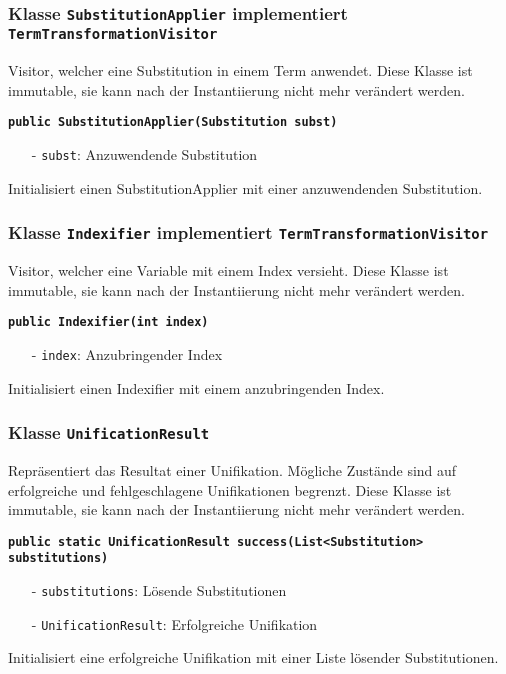 \documentclass[parskip=full,11pt,twoside]{scrartcl}
\begin{document}
\subsubsection{Klasse \texttt{SubstitutionApplier} implementiert \texttt{TermTransformationVisitor}}
Visitor, welcher eine Substitution in einem Term anwendet. Diese Klasse ist immutable, sie kann nach der Instantiierung nicht mehr verändert werden.

\textbf{\texttt{public SubstitutionApplier(Substitution subst)}}
\begin{itemize}[noitemsep]
	\item[-] \texttt{subst}: Anzuwendende Substitution
\end{itemize}
Initialisiert einen SubstitutionApplier mit einer anzuwendenden Substitution.

\subsubsection{Klasse \texttt{Indexifier} implementiert \texttt{TermTransformationVisitor}}
Visitor, welcher eine Variable mit einem Index versieht. Diese Klasse ist immutable, sie kann nach der Instantiierung nicht mehr verändert werden.

\textbf{\texttt{public Indexifier(int index)}}
\begin{itemize}[noitemsep]
	\item[-] \texttt{index}: Anzubringender Index
\end{itemize}
Initialisiert einen Indexifier mit einem anzubringenden Index.
\subsubsection{Klasse \texttt{UnificationResult}}
Repräsentiert das Resultat einer Unifikation. Mögliche Zustände sind auf erfolgreiche und fehlgeschlagene Unifikationen begrenzt. Diese Klasse ist immutable, sie kann nach der Instantiierung nicht mehr verändert werden.

\textbf{\texttt{public static UnificationResult success(List<Substitution>\\substitutions)}}
\begin{itemize}[noitemsep]
	\item[-] \texttt{substitutions}: Lösende Substitutionen
	\item[-] \texttt{UnificationResult}: Erfolgreiche Unifikation
\end{itemize}
Initialisiert eine erfolgreiche Unifikation mit einer Liste lösender Substitutionen.
\end{document}
